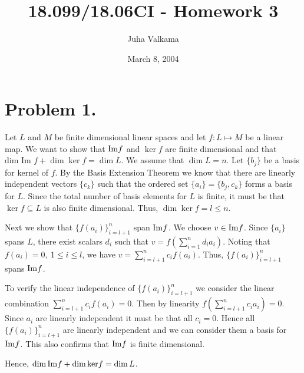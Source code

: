 \documentclass[11pt]{amsart}
\begin{document}
\title{18.099/18.06CI - Homework 3}
\author{Juha Valkama}
\date{March 8, 2004}
\maketitle

\section*{Problem 1.}
Let $L$ and $M$ be finite dimensional linear spaces and let
$f:L\mapsto M$ be a linear map. We want to show that ${\rm Im} f$ and
$\ker f$ are finite dimensional and that $\textrm{dim Im }f+\dim
{\ker}f = \dim L$. We assume that $\dim L = n$. Let $\{b_j\}$ be a
basis for kernel of $f$.  By the Basis Extension Theorem we know that
there are linearly independent vectors $\{c_k\}$ such that the ordered
set $\{a_i\}=\{b_j,c_k\}$ forms a basis for $L$.  Since the total
number of basis elements for $L$ is finite, it must be that $\ker f
\subseteq L$ is also finite dimensional. Thus, $\dim \ker f = l \leq
n$.

Next we show that $\{f(a_i)\}_{i=l+1}^n$ span ${\rm Im} f$. We choose
$v \in {\rm Im} f$. Since $\{a_i\}$ spans $L$, there exist scalars
$d_i$ such that $v=f\left(\sum_{i=1}^n d_ia_i\right)$.  Noting that
$f(a_i)=0, \ 1\leq i \leq l$, we have $v=\sum_{i=l+1}^n c_if(a_i)$.
Thus, $\{f(a_i)\}_{i=l+1}^n$ spans ${\rm Im}f$.

To verify the linear independence of $\{f(a_i)\}_{i=l+1}^n$ we
consider the linear combination $\sum_{i=l+1}^n c_if(a_i)=0$. Then by
linearity $f\left(\sum_{i=l+1}^n c_ia_i\right)=0$. Since ${a_i}$ are
linearly independent it must be that all $c_i=0$.  Hence all
$\{f(a_i)\}_{i=l+1}^n$ are linearly independent and we can consider
them a basis for ${\rm Im}f$. This also confirms that ${\rm Im}f$ is
finite dimensional.

Hence, $\dim {\rm Im}f+\dim {\ker}f = \dim L$.
\end{document}
